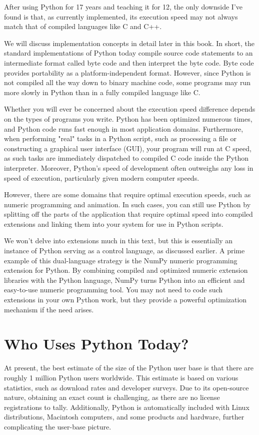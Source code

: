 \documentclass[12pt]{book}
\begin{document}
After using Python for 17 years and teaching it for 12, the only downside I've found is that, as currently implemented, its execution speed may not always match that of compiled languages like C and C++.

We will discuss implementation concepts in detail later in this book. In short, the standard implementations of Python today compile source code statements to an intermediate format called byte code and then interpret the byte code. Byte code provides portability as a platform-independent format. However, since Python is not compiled all the way down to binary machine code, some programs may run more slowly in Python than in a fully compiled language like C.

Whether you will ever be concerned about the execution speed difference depends on the types of programs you write. Python has been optimized numerous times, and Python code runs fast enough in most application domains. Furthermore, when performing "real" tasks in a Python script, such as processing a file or constructing a graphical user interface (GUI), your program will run at C speed, as such tasks are immediately dispatched to compiled C code inside the Python interpreter. Moreover, Python's speed of development often outweighs any loss in speed of execution, particularly given modern computer speeds.

However, there are some domains that require optimal execution speeds, such as numeric programming and animation. In such cases, you can still use Python by splitting off the parts of the application that require optimal speed into compiled extensions and linking them into your system for use in Python scripts.

We won't delve into extensions much in this text, but this is essentially an instance of Python serving as a control language, as discussed earlier. A prime example of this dual-language strategy is the NumPy numeric programming extension for Python. By combining compiled and optimized numeric extension libraries with the Python language, NumPy turns Python into an efficient and easy-to-use numeric programming tool. You may not need to code such extensions in your own Python work, but they provide a powerful optimization mechanism if the need arises.

\section{Who Uses Python Today?}

At present, the best estimate of the size of the Python user base is that there are roughly 1 million Python users worldwide. This estimate is based on various statistics, such as download rates and developer surveys. Due to its open-source nature, obtaining an exact count is challenging, as there are no license registrations to tally. Additionally, Python is automatically included with Linux distributions, Macintosh computers, and some products and hardware, further complicating the user-base picture.
\end{document}
